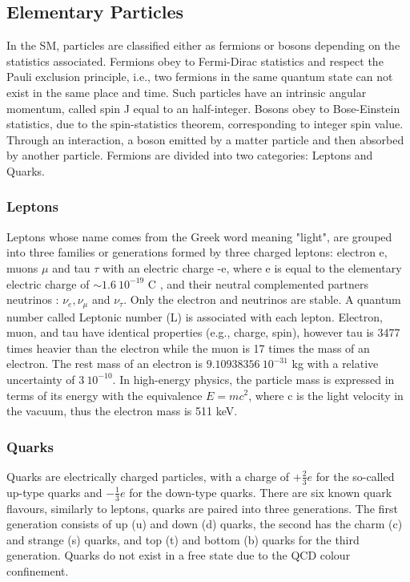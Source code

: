 \subsection{Elementary Particles}
\label{chap1:SM:EP}
In the SM, particles are classified either as fermions or bosons depending on the statistics associated. Fermions obey to Fermi-Dirac statistics and respect the Pauli exclusion principle, i.e., two fermions in the same quantum state can not exist in the same place and time. Such particles have an intrinsic angular momentum, called spin J equal to an half-integer. Bosons obey to Bose-Einstein statistics, due to the spin-statistics theorem, corresponding to integer spin value. Through an interaction, a boson emitted by a matter particle and then absorbed by another particle. Fermions are divided into two categories: Leptons and Quarks.

\subsubsection{Leptons}
Leptons whose name comes from the Greek word meaning "light", are grouped into three families or generations formed by three charged leptons: electron e, muons $\mu$ and tau $\tau$ with an electric charge -e, where e is equal to the elementary electric charge of $\sim 1.6 \ 10^{-19} $ C \cite{PDG}, and their neutral complemented partners neutrinos : $\nu_{e}, \nu_{\mu}$ and $\nu_{\tau}$. Only the electron and neutrinos are stable. A quantum number called Leptonic number (L) is associated with each lepton. Electron, muon, and tau have identical properties (e.g., charge, spin), however tau is 3477 times heavier than the electron while the muon is 17 times the mass of an electron. The rest mass of an electron is $9.10938356 \ 10^{-31} $ kg with a relative uncertainty of $3 \ 10^{-10}$. In high-energy physics, the particle mass is expressed in terms of its energy with the equivalence $E=mc^2$, where c is the light velocity in the vacuum, thus the electron mass is 511 keV.

\subsubsection{Quarks}
Quarks are electrically charged particles, with a charge of $+\frac{2}{3}e$ for the so-called up-type quarks and $-\frac{1}{3}e$ for the down-type quarks. There are six known quark flavours, similarly to leptons, quarks are paired into three generations. The first generation consists of up (u) and down (d) quarks, the second has the charm (c) and strange (s) quarks, and top (t) and bottom (b) quarks for the third generation. Quarks do not exist in a free state due to the QCD colour confinement. \\

